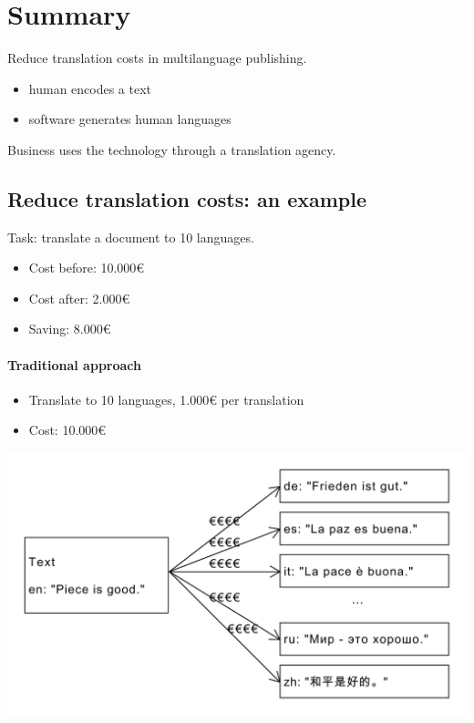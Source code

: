 \documentclass{article}
\begin{document}
\section{Summary}
Reduce translation costs in multilanguage publishing.

\begin{itemize}
\item human encodes a text
\item software generates human languages
\end{itemize}

Business uses the technology through a translation agency.


\subsection{Reduce translation costs: an example}

Task: translate a document to 10 languages.

\begin{itemize}
\item Cost before: 10.000€
\item Cost after: 2.000€
\item Saving: 8.000€
\end{itemize}

\paragraph{Traditional approach}

\begin{itemize}
\item Translate to 10 languages, 1.000€ per translation
\item Cost: 10.000€
\end{itemize}

\includegraphics[scale=0.4]{dia/user-view-current-world.pdf}
\end{document}

